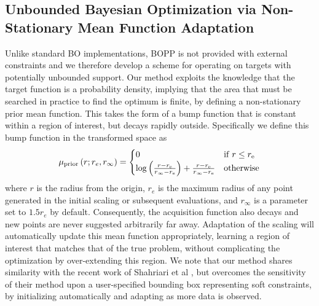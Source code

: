 \subsection{Unbounded Bayesian Optimization via Non-Stationary Mean Function Adaptation}
\label{sec:unbounded}

Unlike standard BO implementations, BOPP is not provided with external constraints and we therefore develop a scheme for operating on targets with potentially unbounded support.  Our method exploits the knowledge that the target function is a probability density, implying that the area that must be searched in practice to find the optimum is finite, by defining a non-stationary prior mean function.  This takes the form of a bump function that is constant within a region of interest, but decays rapidly outside.  Specifically we define this bump function in the transformed space as
\begin{align}
\label{eq:BUMP}
\mu_{\mathrm{prior}}\left(r;r_e,r_{\mathrm{\infty}}\right) = \begin{cases} 0  \hfill & \mathrm{if} \; r \leq r_{\mathrm{e}} \\ 
\log \left(\frac{r-r_{\mathrm{e}}}{r_{\mathrm{\infty}}-r_{\mathrm{e}}}\right)+\frac{r-r_{\mathrm{e}}}{r_{\mathrm{\infty}}-r_{\mathrm{e}}} & \mathrm{otherwise} \end{cases}
\end{align}
where $r$ is the radius from the origin, $r_e$ is the maximum radius of any point generated in the initial scaling or subsequent evaluations, and $r_{\mathrm{\infty}}$ is a parameter set to $1.5 r_{e}$ by default.  Consequently, the acquisition function also decays and new points are never suggested arbitrarily far away.  Adaptation of the scaling will automatically update this mean function appropriately, learning a region of interest that matches that of the true problem, without complicating the optimization by over-extending this region.  We note that our method shares similarity with the recent work of Shahriari et al \citep{shahriari2016unbounded}, but overcomes the sensitivity of their method upon a user-specified bounding box representing soft constraints, by initializing automatically and adapting as more data is observed.